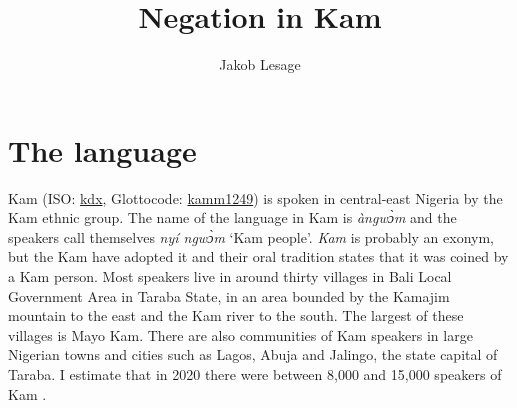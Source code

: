 \documentclass[output=paper,colorlinks,citecolor=brown]{langscibook}
\author{Jakob Lesage\affiliation{Humboldt-Universität zu Berlin; 
    CNRS-LLACAN; 
    INALCO, Paris}}
\title{Negation in Kam}
\begin{document}
\maketitle 

\section{The language}\label{sec:kam:1}

Kam (ISO: \href{https://iso639-3.sil.org/code/kdx}{kdx}, Glottocode: \href{https://glottolog.org/resource/languoid/id/kamm1249}{kamm1249}) is spoken in central-east Nigeria by the Kam ethnic group. The name of the language in Kam is \textit{àngwɔ̀m} and the speakers call themselves \textit{nyí ngwɔ̀m} ‘Kam people’. \textit{Kam} is probably an exonym, but the Kam have adopted it and their oral tradition states that it was coined by a Kam person. Most speakers live in around thirty villages in Bali Local Government Area in Taraba State, in an area bounded by the Kamajim mountain to the east and the Kam river to the south. The largest of these villages is Mayo Kam. There are also communities of Kam speakers in large Nigerian towns and cities such as Lagos, Abuja and Jalingo, the state capital of Taraba. I estimate that in 2020 there were between 8,000 and 15,000 speakers of Kam \citep[6-7]{Lesage2020}.
\end{document}
